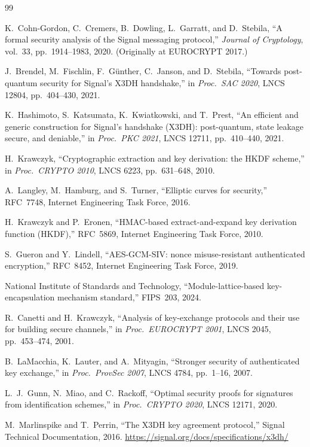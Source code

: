 \documentclass[11pt,a4paper]{article}
\theoremstyle{definition}
\theoremstyle{remark}
\begin{document}
\begingroup
\sloppy
\raggedright
\begin{thebibliography}{99}

K.~Cohn-Gordon, C.~Cremers, B.~Dowling, L.~Garratt, and D.~Stebila,
``A formal security analysis of the Signal messaging protocol,''
\emph{Journal of Cryptology}, vol.~33, pp.~1914--1983, 2020.
(Originally at EUROCRYPT 2017.)

J.~Brendel, M.~Fischlin, F.~G\"{u}nther, C.~Janson, and D.~Stebila,
``Towards post-quantum security for Signal's X3DH handshake,''
in \emph{Proc.\ SAC 2020}, LNCS 12804, pp.~404--430, 2021.

K.~Hashimoto, S.~Katsumata, K.~Kwiatkowski, and T.~Prest,
``An efficient and generic construction for Signal's handshake (X3DH):
post-quantum, state leakage secure, and deniable,''
in \emph{Proc.\ PKC 2021}, LNCS 12711, pp.~410--440, 2021.

H.~Krawczyk,
``Cryptographic extraction and key derivation: the HKDF scheme,''
in \emph{Proc.\ CRYPTO 2010}, LNCS 6223, pp.~631--648, 2010.

A.~Langley, M.~Hamburg, and S.~Turner,
``Elliptic curves for security,''
RFC~7748, Internet Engineering Task Force, 2016.

H.~Krawczyk and P.~Eronen,
``HMAC-based extract-and-expand key derivation function (HKDF),''
RFC~5869, Internet Engineering Task Force, 2010.

S.~Gueron and Y.~Lindell,
``AES-GCM-SIV: nonce misuse-\allowbreak resistant authenticated encryption,''
RFC~8452, Internet Engineering Task Force, 2019.

National Institute of Standards and Technology,
``Module-lattice-based key-encapsulation mechanism standard,''
FIPS~203, 2024.

R.~Canetti and H.~Krawczyk,
``Analysis of key-exchange protocols and their use for building
secure channels,''
in \emph{Proc.\ EUROCRYPT 2001}, LNCS 2045, pp.~453--474, 2001.

B.~LaMacchia, K.~Lauter,\allowbreak{} and A.~Mityagin,
``Stronger security of authenticated key exchange,''
in \emph{Proc.\ ProvSec 2007}, LNCS 4784, pp.~1--16, 2007.

L.~J.~Gunn, N.~Miao, and C.~Rackoff,
``Optimal security proofs for signatures from identification schemes,''
in \emph{Proc.\ CRYPTO 2020}, LNCS 12171, 2020.

M.~Marlinspike and T.~Perrin,
``The X3DH key agreement protocol,''
Signal Technical Documentation, 2016.
\url{https://signal.org/docs/specifications/x3dh/}

\end{thebibliography}
\endgroup
\end{document}
